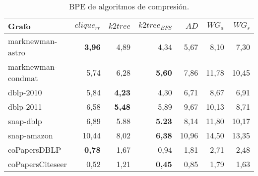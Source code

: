 \begin{table}
	\caption{BPE de algoritmos de compresión.}
	\label{table:BPEcomp}
	\centering
	\begin{tabular}{l|r|r|r|r|r|r}
		\toprule
		Grafo & $clique_{rr}$ & $k2tree$ & $k2tree_{BFS}$ & $AD$ & $WG_{a}$ & $WG_{s}$\\
        \midrule
        marknewman-astro & \textbf{3,96} & 4,89 & 4,34 & 5,67 & 8,10 & 7,30\\
        marknewman-condmat & 5,74 & 6,28 & \textbf{5,60} & 7,86 & 11,78 & 10,45\\
        dblp-2010 & 5,84 & \textbf{4,23} & 4,30 & 6,71 & 8,67 & 6,91 \\
        dblp-2011 & 6,58 & \textbf{5,48} & 5,89 & 9,67 & 10,13 & 8,71 \\
        snap-dblp & 6,89 & 5.88 & \textbf{5.23} & 8,14 & 11,80 & 10,17 \\
        snap-amazon & 10,44 & 8,02 & \textbf{6,38} & 10,96 & 14,50 & 13,35 \\
        coPapersDBLP & \textbf{0,78} & 1,67 & 0,94 & 1,81 & 2,71 & 2,48 \\
        coPapersCiteseer & 0,52 & 1,21 & \textbf{0,45} & 0,85 & 1,79 &  1,63 \\
		\bottomrule
	\end{tabular}
\end{table}
